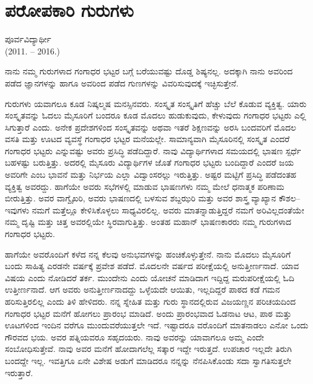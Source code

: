 \chapter{ಪರೋಪಕಾರಿ ಗುರುಗಳು}

\begin{center}
\smallskip
ಪೂರ್ವವಿದ್ಯಾರ್ಥೀ\\
(2011. – 2016.)
\addrule
\end{center}
ನಾನು ನಮ್ಮ ಗುರುಗಳಾದ ಗಂಗಾಧರ ಭಟ್ಟರ ಬಗ್ಗೆ ಬರೆಯುವಷ್ಟು ದೊಡ್ಡ ಶಿಷ್ಯನಲ್ಲ. ಅದಕ್ಕಾಗಿ ನಾನು ಅವರಿಂದ ಪಡೆದ ಜ್ಞಾನಗಳನ್ನು ಹಾಗೂ ಅವರಿಂದ ಪಡೆದ ಗುಣಗಳನ್ನು ವಿವರಿಸುವುದಕ್ಕೆ ಇಚ್ಛಿಸುತ್ತೇನೆ.

ಗುರುಗಳು ಯವಾಗಲೂ ಕೂಡ ನಿಷ್ಕಲ್ಮಷ ಮನಸ್ಸಿನವರು. ಸಂಸ್ಕೃತ ಸಂಸ್ಕೃತಿಗೆ ಹೆಚ್ಚು ಬೆಲೆ ಕೊಡುವ ವ್ಯಕ್ತಿತ್ವ. ಯಾರು ಸಂಸ್ಕೃತವನ್ನು ಓದಲು ಮೈಸೂರಿಗೆ ಬಂದರೂ ಕೂಡ ಮೊದಲು ಹುಡುಕುವುದು, ಕೇಳುವುದು ಗಂಗಾಧರ ಭಟ್ಟರು ಎಲ್ಲಿ ಸಿಗುತ್ತಾರೆ ಎಂದು. ಅನೇಕ ಪ್ರದೇಶಗಳಿಂದ ಸಂಸ್ಕೃತವನ್ನು ಅಥವಾ ಇತರೆ ಶಿಕ್ಷಣವನ್ನು ಅರಸಿ ಬಂದವರಿಗೆ ಮೊದಲ ವಸತಿ ಮತ್ತು ಊಟದ ವ್ಯವಸ್ಥೆ ಗಂಗಾಧರ ಭಟ್ಟರ ಮನೆಯಲ್ಲೇ. ಸಾಮಾನ್ಯವಾಗಿ ಮೈಸೂರಿನಲ್ಲಿ ಸಂಸ್ಕೃತ ಎಂದರೆ ಗಂಗಾಧರ ಭಟ್ಟರು ಎನ್ನುವಷ್ಟು ಅವರು ಪ್ರಸಿದ್ಧಿ ಪಡೆದಿದ್ದಾರೆ. ನಾವು ವಿದ್ಯಾರ್ಥಿಗಳಾದ ಸಮಯದಲ್ಲಿ ಭಾಷಣ ಸ್ಪರ್ಧೆ ಬಹಳಷ್ಟು ಬರುತ್ತಿತ್ತು. ಅದರಲ್ಲಿ ಮೈಸೂರು ವಿದ್ಯಾರ್ಥಿಗಳ ಜೊತೆ ಗಂಗಾಧರ ಭಟ್ಟರು ಬಂದಿದ್ದಾರೆ ಎಂದರೆ ಜಯ ಅವರಿಗೇ ಎಂಬ ಭಾವನೆ ಮತ್ತು ನಿರ್ಭಯ ಎಲ್ಲಾ ವಿದ್ವಾಂಸರಲ್ಲು ಇರುತ್ತಿತ್ತು. ಅಷ್ಟರ ಮಟ್ಟಿಗೆ ಪ್ರಸಿದ್ಧಿ ಪಡೆದಂತಹ ವ್ಯಕ್ತಿತ್ವ ಅವರದ್ದು. ಹಾಗೆಯೇ ಅವರು ಸಭೆಗಳಲ್ಲಿ ಮಾಡುವ ಭಾಷಣಗಳು ನಮ್ಮ ಮೇಲೆ ಧನಾತ್ಮಕ ಪರಿಣಾಮ ಬೀರುತ್ತಿತ್ತು. ಅವರ ವಾಗ್ವೈಖರಿ, ಅವರು ಭಾಷಣದಲ್ಲಿ ಬಳಸುವ ಶಬ್ದಝರಿ ಮತ್ತು ಅವರ ಶಾಸ್ತ್ರ ವ್ಯಾಖ್ಯಾನ ಕೌಶಲ– ಇವುಗಳು ನಮಗೆ ಮತ್ತೆಲ್ಲೂ ಕೇಳಿಸಿಕೊಳ್ಳಲು ಸಾಧ್ಯವಿರಲಿಲ್ಲ. ಅವರು ಮಾತನ್ನಾಡುತ್ತಿದ್ದರೆ ನಮಗೆ ಅರಿವಿಲ್ಲದಂತೆಯೇ ನಮ್ಮ ದೃಷ್ಟಿ ಮತ್ತು ಚಿತ್ತ ಅವರಲ್ಲಿಯೇ ಸ್ಥಿರವಾಗುತ್ತಿತ್ತು. ಅಂತಹ ಮಹಾನ್ ಭಾಷಣಕಾರರು ನಮ್ಮ ಗುರುಗಳಾದ ಗಂಗಾಧರ ಭಟ್ಟರು.
	
ಹಾಗೆಯೇ ಅವರೊಂದಿಗೆ ಕಳೆದ ನನ್ನ ಕೆಲವು ಅನುಭವಗಳನ್ನು ಹಂಚಿಕೊಳ್ಳುತ್ತೇನೆ. ನಾನು ಮೊದಲು ಮೈಸೂರಿಗೆ ಬಂದು ಸಾಹಿತ್ಯ ಎರಡನೇ ವರ್ಷಕ್ಕೆ ಪ್ರವೇಶ ಪಡೆದೆ. ಮೊದಲನೇ ವರ್ಷದ ಪರೀಕ್ಷೆಯಲ್ಲಿ ಅನುತ್ತೀರ್ಣನಾದೆ. ಯಾವ ವಿಷಯ ಎಂದು ನೋಡಿದರೆ ತರ್ಕ. ಮುಂದೇನು ಎಂದು ಯೋಚನೆ ಮಾಡಿದಾಗ ಇದ್ದಿದ್ದ ಮರುಪರೀಕ್ಷೆಯಲ್ಲಿ ಓದಿ ಉತ್ತೀರ್ಣನಾದೆ. ಆಗ ಅವರು ಅನುತ್ತೀರ್ಣನಾದದ್ದು ಒಳ್ಳೆಯದೇ ಆಯಿತು, ಇಲ್ಲದಿದ್ದರೆ ಪಾಠದ ಕಡೆ ಗಮನ ಹರಿಸುತ್ತಿರಲಿಲ್ಲ ಎಂದು ತಿಳಿ ಹೇಳಿದರು. ನನ್ನ ಸ್ನೇಹಿತ ಮತ್ತು ಗುರು ಸ್ಥಾನದಲ್ಲಿರುವ ವಿಜಯಣ್ಣನ ಪರಿಚಯದಿಂದ ಗಂಗಾಧರ ಭಟ್ಟರ ಮನೆಗೆ ಹೋಗಲು ಪ್ರಾರಂಭ ಮಾಡಿದೆ. ಅಂದು ಪ್ರಾರಂಭವಾದ ಓಡನಾಟ ಆಟ, ಪಾಠ ಮತ್ತು ಊಟಗಳಿಂದ ಇಂದಿನ ವರೆಗೂ ಮುಂದುವರೆಯುತ್ತಲೇ ಇದೆ. ಇಷ್ಟಾದರೂ ವರೊಂದಿಗೆ ಮಾತನಾಡಲು ಎನೋ ಒಂದು ಗೌರವದ ಭಯ. ಅವರ ಪತ್ನಿಯವರೂ ಸಹೃದಯರು. ನಾವು ಅವರನ್ನು ಯಾವಾಗಲೂ ಅಮ್ಮ ಎಂದೇ ಸಂಬೋಧಿಸುತ್ತೇವೆ. ನಾವು ಅವರ ಮನೆಗೆ ಹೋದಾಗಲೆಲ್ಲ ಸತ್ಕಾರ ಇದ್ದೇ ಇರುತ್ತದೆ. ಉಪಚಾರ ಇಲ್ಲದೇ ತಿರುಗಿ ಬಂದದ್ದೇ ಇಲ್ಲ. ಇವತ್ತಿಗೂ ಏನೇ ವಿಶೇಷ ಅಡುಗೆ ಮಾಡಿದರೂ ನನ್ನನ್ನು ನೆನಪಿಸಿಕೊಂಡು ಸದಾ ಸ್ವಾಗತಿಸುತ್ತಲೇ ಇರುತ್ತಾರೆ.
	
